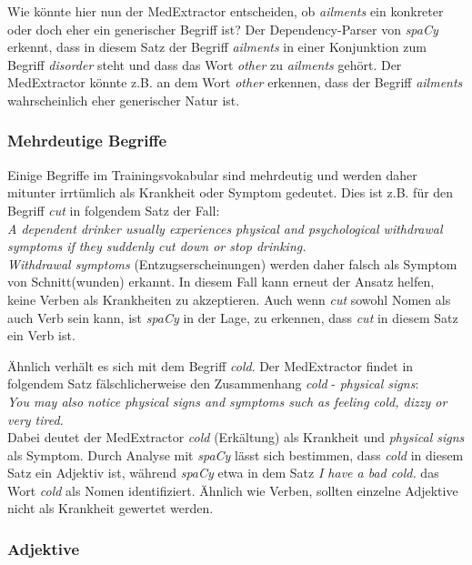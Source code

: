 Wie könnte hier nun der MedExtractor entscheiden, ob \emph{ailments} ein konkreter oder doch eher ein generischer Begriff ist? Der Dependency-Parser von \emph{spaCy} erkennt, dass in diesem Satz der Begriff \emph{ailments} in einer Konjunktion zum Begriff \emph{disorder} steht und dass das Wort \emph{other} zu \emph{ailments} gehört. Der MedExtractor könnte z.B. an dem Wort \emph{other} erkennen, dass der Begriff \emph{ailments} wahrscheinlich eher generischer Natur ist.

\subsubsection{Mehrdeutige Begriffe}
\label{subsec: mehrdeutig} 

Einige Begriffe im Trainingsvokabular sind mehrdeutig und werden daher mitunter irrtümlich als Krankheit oder Symptom gedeutet. Dies ist z.B. für den Begriff \emph{cut} in folgendem Satz der Fall:\\

\emph{\glqq A dependent drinker usually experiences physical and psychological withdrawal symptoms if they suddenly cut down or stop drinking.\grqq}\\

\emph{Withdrawal symptoms} (Entzugserscheinungen) werden daher falsch als Symptom von Schnitt(wunden) erkannt. In diesem Fall kann erneut der Ansatz helfen, keine Verben als Krankheiten zu akzeptieren. Auch wenn \emph{cut} sowohl Nomen als auch Verb sein kann, ist \emph{spaCy} in der Lage, zu erkennen, dass \emph{cut} in diesem Satz ein Verb ist.

Ähnlich verhält es sich mit dem Begriff \emph{cold}. Der MedExtractor findet in folgendem Satz fälschlicherweise den Zusammenhang \emph{cold} - \emph {physical signs}:\\

\emph{\glqq You may also notice physical signs and symptoms such as feeling cold, dizzy or very tired.\grqq}\\

Dabei deutet der MedExtractor \emph{cold} (Erkältung) als Krankheit und \emph{physical signs} als Symptom.  Durch Analyse mit \emph{spaCy} lässt sich bestimmen, dass \emph{cold} in diesem Satz ein Adjektiv ist, während \emph{spaCy} etwa in dem Satz \emph{\glqq I have a bad cold.\grqq} das Wort \emph{cold} als Nomen identifiziert. Ähnlich wie Verben, sollten einzelne Adjektive nicht als Krankheit gewertet werden.

\subsubsection{Adjektive}
\label{subsec: adjektiv} 

